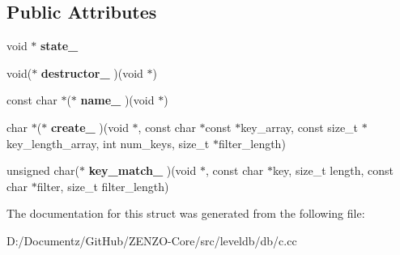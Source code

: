 \subsection*{Public Attributes}
\begin{DoxyCompactItemize}
\item 
\mbox{\label{structleveldb__filterpolicy__t_a35aa5dd2f350f6eafa4ae904e55dcbe2}} 
void $\ast$ {\bfseries state\+\_\+}
\item 
\mbox{\label{structleveldb__filterpolicy__t_ac743c53a14a4061cf30832a1861573ed}} 
void($\ast$ {\bfseries destructor\+\_\+} )(void $\ast$)
\item 
\mbox{\label{structleveldb__filterpolicy__t_a5fbc18ad0916314ffafe205543bad720}} 
const char $\ast$($\ast$ {\bfseries name\+\_\+} )(void $\ast$)
\item 
\mbox{\label{structleveldb__filterpolicy__t_acf8194876ecb2c47ef33cb7a7dec3d8e}} 
char $\ast$($\ast$ {\bfseries create\+\_\+} )(void $\ast$, const char $\ast$const $\ast$key\+\_\+array, const size\+\_\+t $\ast$key\+\_\+length\+\_\+array, int num\+\_\+keys, size\+\_\+t $\ast$filter\+\_\+length)
\item 
\mbox{\label{structleveldb__filterpolicy__t_a453f04cb3420879256c6194b5de0a818}} 
unsigned char($\ast$ {\bfseries key\+\_\+match\+\_\+} )(void $\ast$, const char $\ast$key, size\+\_\+t length, const char $\ast$filter, size\+\_\+t filter\+\_\+length)
\end{DoxyCompactItemize}


The documentation for this struct was generated from the following file\+:\begin{DoxyCompactItemize}
\item 
D\+:/\+Documentz/\+Git\+Hub/\+Z\+E\+N\+Z\+O-\/\+Core/src/leveldb/db/c.\+cc\end{DoxyCompactItemize}
